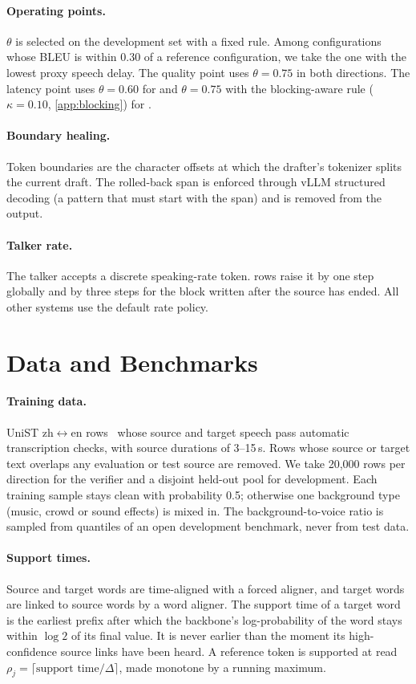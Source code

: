 \paragraph{Operating points.}
$\theta$ is selected on the development set with a fixed rule.
Among configurations whose BLEU is within 0.30 of a reference configuration, we take the one with the lowest proxy speech delay.
The quality point uses $\theta = 0.75$ in both directions.
The latency point uses $\theta = 0.60$ for \enzh{} and $\theta = 0.75$ with the blocking-aware rule ($\kappa = 0.10$, \cref{app:blocking}) for \zhen{}.

\paragraph{Boundary healing.}
Token boundaries are the character offsets at which the drafter's tokenizer splits the current draft.
The rolled-back span is enforced through vLLM structured decoding (a pattern that must start with the span) and is removed from the output.

\paragraph{Talker rate.}
The talker accepts a discrete speaking-rate token.
\ours{} rows raise it by one step globally and by three steps for the block written after the source has ended.
All other systems use the default rate policy.

\section{Data and Benchmarks}
\label{app:data}

\paragraph{Training data.}
UniST zh$\leftrightarrow$en rows~\citep{uniss2025} whose source and target speech pass automatic transcription checks, with source durations of 3--15\,s.
Rows whose source or target text overlaps any evaluation or test source are removed.
We take 20{,}000 rows per direction for the verifier and a disjoint held-out pool for development.
Each training sample stays clean with probability 0.5; otherwise one background type (music, crowd or sound effects) is mixed in.
The background-to-voice ratio is sampled from quantiles of an open development benchmark, never from test data.

\paragraph{Support times.}
Source and target words are time-aligned with a forced aligner, and target words are linked to source words by a word aligner.
The support time of a target word is the earliest prefix after which the backbone's log-probability of the word stays within $\log 2$ of its final value.
It is never earlier than the moment its high-confidence source links have been heard.
A reference token is supported at read $\rho_j = \lceil \text{support time} / \Delta \rceil$, made monotone by a running maximum.

